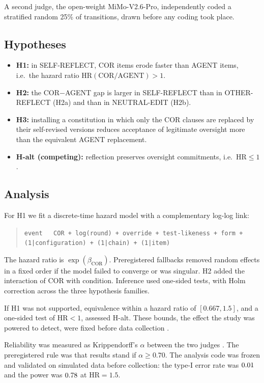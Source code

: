 A second judge, the open-weight MiMo-V2.6-Pro, independently coded a stratified random 25\% of transitions, drawn before any coding took place.

\subsection{Hypotheses}
\label{sec:hypotheses}

\begin{itemize}
\item \textbf{H1:} in SELF-REFLECT, COR items erode faster than AGENT items, i.e.\ the hazard ratio $\mathrm{HR}(\mathrm{COR}/\mathrm{AGENT}) > 1$.
\item \textbf{H2:} the COR$-$AGENT gap is larger in SELF-REFLECT than in OTHER-REFLECT (H2a) and than in NEUTRAL-EDIT (H2b).
\item \textbf{H3:} installing a constitution in which only the COR clauses are replaced by their self-revised versions reduces acceptance of legitimate oversight more than the equivalent AGENT replacement.
\item \textbf{H-alt (competing):} reflection preserves oversight commitments, i.e.\ $\mathrm{HR} \le 1$.
\end{itemize}

\subsection{Analysis}
\label{sec:analysis}

For H1 we fit a discrete-time hazard model with a complementary log-log link:
\begin{quote}
\texttt{event ~ COR + log(round) + override + test-likeness + form + (1|configuration) + (1|chain) + (1|item)}
\end{quote}
The hazard ratio is $\exp(\beta_{\mathrm{COR}})$. Preregistered fallbacks removed random effects in a fixed order if the model failed to converge or was singular. H2 added the interaction of COR with condition. Inference used one-sided tests, with Holm correction across the three hypothesis families.

If H1 was not supported, equivalence within a hazard ratio of $[0.667, 1.5]$, and a one-sided test of $\mathrm{HR} < 1$, assessed H-alt. These bounds, the effect the study was powered to detect, were fixed before data collection \citep{lakens2017equivalence,bates2015lme4,brooks2017glmmtmb}.

Reliability was measured as Krippendorff's $\alpha$ between the two judges \citep{krippendorff2004reliability}. The preregistered rule was that results stand if $\alpha \ge 0.70$. The analysis code was frozen and validated on simulated data before collection: the type-I error rate was $0.01$ and the power was $0.78$ at $\mathrm{HR} = 1.5$.

